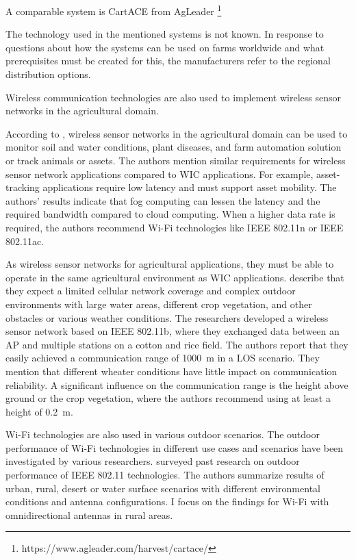 A comparable system is CartACE from AgLeader \footnote{https://www.agleader.com/harvest/cartace/}

The technology used in the mentioned systems is not known. In response to questions about how the systems can be used on farms worldwide and what prerequisites must be created for this, the manufacturers refer to the regional distribution options.

Wireless communication technologies are also used to implement wireless sensor networks in the agricultural domain.

According to \textcite{ahmed_internet_2018}, wireless sensor networks in the agricultural domain can be used to monitor soil and water conditions, plant diseases, and farm automation solution
or track animals or assets. The authors mention similar requirements for wireless sensor network applications compared to \ac{WIC} applications.
For example, asset-tracking applications require low latency and must support asset mobility.
The authors' results indicate that fog computing can lessen the latency and the required bandwidth compared to cloud computing.
When a higher data rate is required, the authors recommend Wi-Fi technologies like IEEE 802.11n or IEEE 802.11ac.

As wireless sensor networks for agricultural applications, they must be able to operate in the same agricultural environment as \ac{WIC} applications.
\textcite{brinkhoff_characterization_2017} describe that they expect a limited cellular network coverage and complex outdoor
environments with large water areas, different crop vegetation, and other obstacles or various weather conditions. The
researchers developed a wireless sensor network based on IEEE 802.11b, where they exchanged data between an \ac{AP} and multiple stations on
a cotton and rice field. The authors report that they easily achieved a communication range of \SI{1000}{\metre} in a \ac{LOS} scenario.
They mention that different wheater conditions have little impact on communication reliability. A significant influence on the communication range is the height above ground or the crop vegetation, where the authors recommend using at least a height of \SI{0.2}{\metre}.


Wi-Fi technologies are also used in various outdoor scenarios.
The outdoor performance of Wi-Fi technologies in different use cases and scenarios have been investigated by various researchers.
\textcite{aust_outdoor_2015} surveyed past research on outdoor performance of IEEE 802.11 technologies. The authors summarize results of
urban, rural, desert or water surface scenarios with different environmental conditions and antenna configurations. I focus on the
findings for Wi-Fi with omnidirectional antennas in rural areas.

